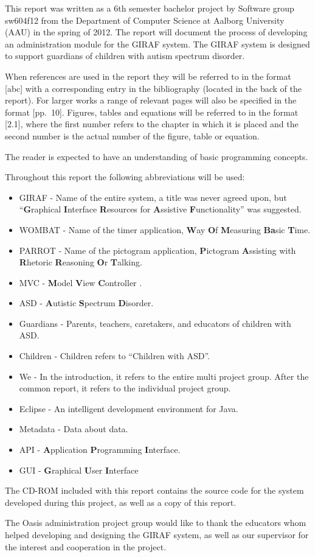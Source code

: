 This report was written as a 6th semester bachelor project by Software group sw604f12 from the Department of Computer Science at Aalborg University (AAU) in the spring of 2012. The report will document the process of developing an administration module for the GIRAF system. The GIRAF system is designed to support guardians of children with autism spectrum disorder.

When references are used in the report they will be referred to in the format [abc] with a corresponding entry in the bibliography (located in the back of the report). For larger works a range of relevant pages will also be specified in the format [pp.~10]. Figures, tables and equations will be referred to in the format [2.1], where the first number refers to the chapter in which it is placed and the second number is the actual number of the figure, table or equation.

The reader is expected to have an understanding of basic programming concepts.

Throughout this report the following abbreviations will be used:

\begin{itemize}
	\item GIRAF - Name of the entire system, a title was never agreed upon, but ``\textbf{G}raphical
	\textbf{I}nterface \textbf{R}esources for \textbf{A}ssistive \textbf{F}unctionality'' was suggested.
	\item WOMBAT - Name of the timer application, \textbf{W}ay \textbf{O}f \textbf{M}easuring \textbf{Ba}sic \textbf{T}ime. 
	\item PARROT - Name of the pictogram application, \textbf{P}ictogram \textbf{A}ssisting with \textbf{R}hetoric \textbf{R}easoning \textbf{O}r \textbf{T}alking.
	\item MVC - \textbf{M}odel \textbf{V}iew \textbf{C}ontroller \cite{MVC}.
	\item ASD - \textbf{A}utistic \textbf{S}pectrum \textbf{D}isorder.
	\item Guardians - Parents, teachers, caretakers, and educators of children with ASD.
	\item Children - Children refers to ``Children with ASD''.
	\item We - In the introduction, it refers to the entire multi project group. After the common report, it refers to the individual project group.
	\item Eclipse - An intelligent development environment for Java.
	\item Metadata - Data about data.
	\item API - \textbf{A}pplication \textbf{P}rogramming \textbf{I}nterface.
	\item GUI - \textbf{G}raphical \textbf{U}ser \textbf{I}nterface
\end{itemize}


The CD-ROM included with this report contains the source code for the system developed during this project, as well as a copy of this report.

The Oasis administration project group would like to thank the educators whom helped developing and designing the GIRAF system, as well as our supervisor for the interest and cooperation in the project.